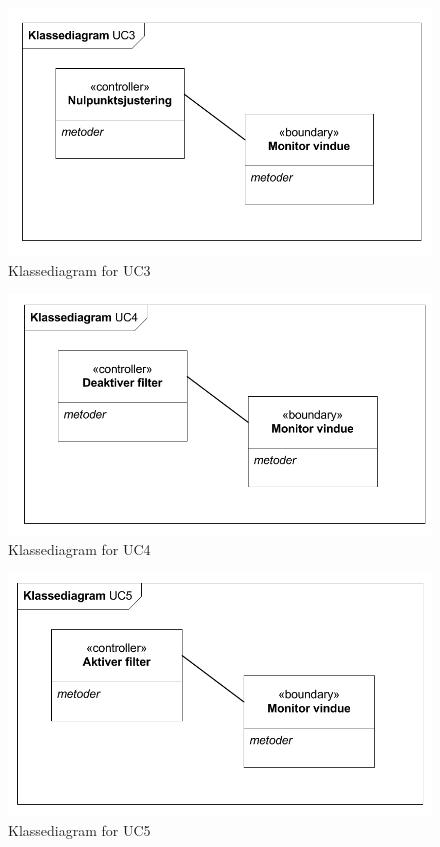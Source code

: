 \begin{figure}[H]
	\centering
	\includegraphics[width=1\textwidth]{Figurer/Snip20151102_17}
	\caption{Klassediagram for UC3}
\end{figure}

\begin{figure}[H]
	\centering
	\includegraphics[width=1\textwidth]{Figurer/Snip20151102_18}
	\caption{Klassediagram for UC4}
\end{figure}

\begin{figure}[H]
	\centering
	\includegraphics[width=1\textwidth]{Figurer/Snip20151102_19}
	\caption{Klassediagram for UC5}
\end{figure}

